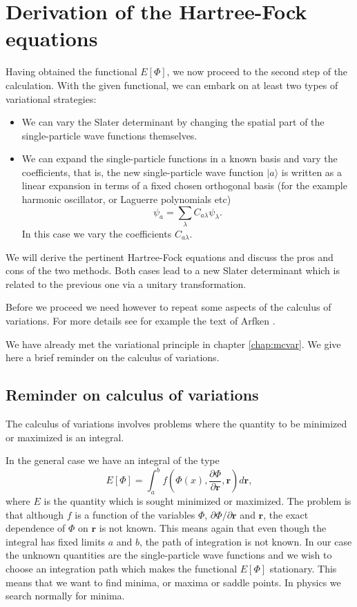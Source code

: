 \section{Derivation of the Hartree-Fock equations}

Having obtained the functional $E[\Phi]$, we now proceed to the second
step of the calculation. 
With the given functional, we can embark on at least  two types of variational strategies:
\begin{itemize}
\item We can vary the Slater determinant by changing the spatial part of the single-particle
wave functions themselves. 
\item   We can expand the single-particle functions in a known basis  and vary the coefficients, 
that is, the new single-particle wave function $|a\rangle$ is written as a linear expansion
in terms of a fixed chosen orthogonal basis (for the example harmonic oscillator, or Laguerre polynomials etc)
\[
\psi_a  = \sum_{\lambda} C_{a\lambda}\psi_{\lambda}.
\]
In this case we vary the coefficients $C_{a\lambda}$. 
 \end{itemize}
We will derive the pertinent Hartree-Fock equations and discuss the pros and cons of the two methods.
Both cases lead to a new Slater determinant which is related to the previous one via  a unitary transformation.

Before we proceed we need however to repeat some aspects of the calculus of variations.
For more details see for example the text of Arfken \cite{arfken1985}.

We have already met the variational principle in chapter \ref{chap:mcvar}.
We give here a brief reminder on the calculus of variations.

\subsection{Reminder on calculus of variations}
The calculus of variations involves 
problems where the quantity to be minimized or maximized is an integral. 

In the general case we have an integral of the type
\[ E[\Phi]= \int_a^b f(\Phi(x),\frac{\partial \Phi}{\partial \mathbf{r}},\mathbf{r})d\mathbf{r},\]
where $E$ is the quantity which is sought minimized or maximized.
The problem is that although $f$ is a function of the variables $\Phi$, $\partial \Phi/\partial \mathbf{r}$ 
and $\mathbf{r}$, the exact dependence of
$\Phi$ on $\mathbf{r}$ is not known.  This means again that even though 
the integral has fixed limits $a$ and $b$, the path of integration is
not known. In our case the unknown quantities are the single-particle 
wave functions and we wish to choose an integration path which makes
the functional $E[\Phi]$ stationary. This means that we want to find minima, or maxima or saddle points. 
In physics we search normally for minima.

